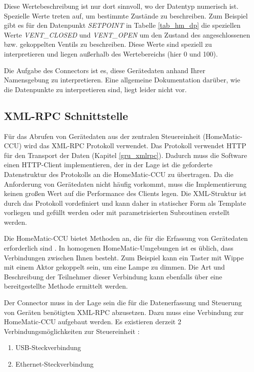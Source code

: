 Diese Wertebeschreibung ist nur dort sinnvoll, wo der Datentyp numerisch ist.
Spezielle Werte treten auf, um bestimmte Zustände zu beschreiben.
Zum Beispiel gibt es für den Datenpunkt \emph{SETPOINT} in Tabelle \ref{tab_hm_dp}
die speziellen Werte \emph{VENT\_CLOSED} und \emph{VENT\_OPEN} um den Zustand des angeschlossenen
bzw. gekoppelten Ventils zu beschreiben.
Diese Werte sind speziell zu interpretieren und liegen außerhalb des Wertebereichs
(hier 0 und 100).

Die Aufgabe des Connectors ist es, diese Gerätedaten anhand Ihrer Namensgebung zu interpretieren.
Eine allgemeine Dokumentation darüber, wie die Datenpunkte zu interpretieren sind, liegt leider
nicht vor.

\subsection{XML-RPC Schnittstelle}
\label{ana_hm_xmlrpc}

Für das Abrufen von Gerätedaten aus der zentralen Steuereinheit (HomeMatic-CCU) wird das XML-RPC
Protokoll verwendet.
Das Protokoll verwendet HTTP für den Transport der Daten (Kapitel \ref{gru_xmlrpc}).
Dadurch muss die Software einen HTTP-Client implementieren, der in der Lage ist die geforderte
Datenstruktur des Protokolls an die HomeMatic-CCU zu übertragen.
Da die Anforderung von Gerätedaten nicht häufig vorkommt, muss die Implementierung keinen großen
Wert auf die Performance des Clients legen.
Die XML-Struktur ist durch das Protokoll vordefiniert und kann daher in statischer Form als
Template vorliegen und gefüllt werden oder mit parametrisierten Subroutinen erstellt werden.

Die HomeMatic-CCU bietet Methoden an, die für die Erfassung von Gerätedaten erforderlich
sind \cite{homematic_xmlrpc}.
In homogenen HomeMatic-Umgebungen ist es üblich, dass Verbindungen zwischen Ihnen besteht.
Zum Beispiel kann ein Taster mit Wippe mit einem Aktor gekoppelt sein, um eine Lampe zu dimmen.
Die Art und Beschreibung der Teilnehmer dieser Verbindung kann ebenfalls über eine
bereitgestellte Methode ermittelt werden.

Der Connector muss in der Lage sein die für die Datenerfassung und Steuerung von Geräten benötigten
XML-RPC abzusetzen.
Dazu muss eine Verbindung zur HomeMatic-CCU aufgebaut werden.
Es existieren derzeit 2 Verbindungsmöglichkeiten zur Steuereinheit \cite{homematic_ccu}:
\begin{enumerate}
\item USB-Steckverbindung
\item Ethernet-Steckverbindung
\end{enumerate}

